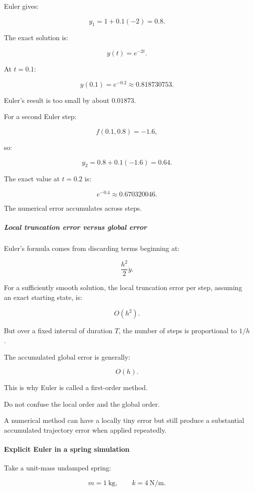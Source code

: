 Euler gives:

\[
y_1=1+0.1(-2)=\boxed{0.8}.
\]

The exact solution is:

\[
y(t)=e^{-2t}.
\]

At \(t=0.1\):

\[
y(0.1)=e^{-0.2}\approx0.818730753.
\]

Euler's result is too small by about \(0.01873\).

For a second Euler step:

\[
f(0.1,0.8)=-1.6,
\]

so:

\[
y_2=0.8+0.1(-1.6)=0.64.
\]

The exact value at \(t=0.2\) is:

\[
e^{-0.4}\approx0.670320046.
\]

The numerical error accumulates across steps.

\subparagraph{Local truncation error versus global error}\label{02-foundations-ii-ch025-local-truncation-error-versus-global-error}

Euler's formula comes from discarding terms beginning at:

\[
\frac{h^2}{2}\ddot y.
\]

For a sufficiently smooth solution, the local truncation error per step, assuming an exact starting state, is:

\[
O(h^2).
\]

But over a fixed interval of duration \(T\), the number of steps is proportional to \(1/h\).

The accumulated global error is generally:

\[
\boxed{O(h)}.
\]

This is why Euler is called a first-order method.

Do not confuse the local order and the global order.

A numerical method can have a locally tiny error but still produce a substantial accumulated trajectory error when applied repeatedly.

\paragraph{Explicit Euler in a spring simulation}\label{02-foundations-ii-ch025-explicit-euler-in-a-spring-simulation}

Take a unit-mass undamped spring:

\[
m=1\ \mathrm{kg}, \qquad k=4\ \mathrm{N/m}.
\]


